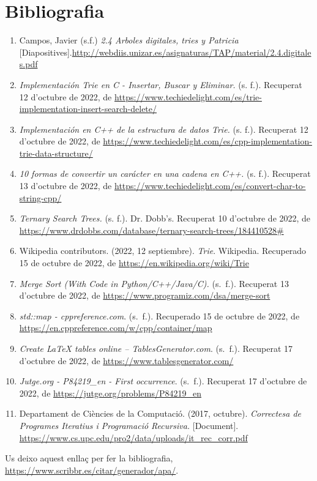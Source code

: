 \documentclass[titlepage]{article}
\begin{document}
\section{Bibliografia}
\begin{enumerate}
    \item Campos, Javier (s.f.) \textit{2.4 Arboles digitales, tries y Patricia} [Diapositives].\url{http://webdiis.unizar.es/asignaturas/TAP/material/2.4.digitales.pdf }
    \item \textit{Implementación Trie en C - Insertar, Buscar y Eliminar.} (s. f.). Recuperat 12 d'octubre de 2022, de \url{https://www.techiedelight.com/es/trie-implementation-insert-search-delete/}
    \item \textit{Implementación en C++ de la estructura de datos Trie.} (s. f.). Recuperat 12 d'octubre de 2022, de \url{https://www.techiedelight.com/es/cpp-implementation-trie-data-structure/}
    \item \textit{10 formas de convertir un carácter en una cadena en C++.} (s. f.). Recuperat 13 d'octubre de 2022, de \url{https://www.techiedelight.com/es/convert-char-to-string-cpp/}
    \item \textit{Ternary Search Trees.} (s. f.). Dr. Dobb's. Recuperat 10 d'octubre de 2022, de \url{https://www.drdobbs.com/database/ternary-search-trees/184410528#}
    \item Wikipedia contributors. (2022, 12 septiembre). \textit{Trie}. Wikipedia. Recuperado 15 de octubre de 2022, de \url{https://en.wikipedia.org/wiki/Trie}
    \item \textit{Merge Sort (With Code in Python/C++/Java/C).} (s. f.). Recuperat 13 d'octubre de 2022, de \url{https://www.programiz.com/dsa/merge-sort}
    \item \textit{std::map - cppreference.com}. (s. f.). Recuperado 15 de octubre de 2022, de
    \url{https://en.cppreference.com/w/cpp/container/map}
    \item \textit{Create LaTeX tables online – TablesGenerator.com}. (s. f.). Recuperat 17 d'octubre de 2022, de \url{https://www.tablesgenerator.com/}

    \item \textit{Jutge.org - P84219\_en - First occurrence}. (s. f.). Recuperat 17 d'octubre de 2022, de \url{https://jutge.org/problems/P84219_en}

    \item Departament de Ciències de la Computació. (2017, octubre). \textit{Correctesa de Programes Iteratius i Programació Recursiva.} [Document]. \url{https://www.cs.upc.edu/pro2/data/uploads/it_rec_corr.pdf}
    
\end{enumerate}

Us deixo aquest enllaç per fer la bibliografia, \url{https://www.scribbr.es/citar/generador/apa/}.
\end{document}
